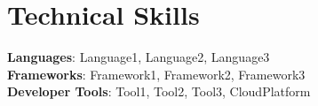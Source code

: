 \section{Technical Skills}
 \begin{itemize}[leftmargin=0.15in, label={}]
    \small{\item{
     \textbf{Languages}{: Language1, Language2, Language3} \\
     \textbf{Frameworks}{: Framework1, Framework2, Framework3} \\
     \textbf{Developer Tools}{: Tool1, Tool2, Tool3, CloudPlatform} \\
    }}
 \end{itemize}
